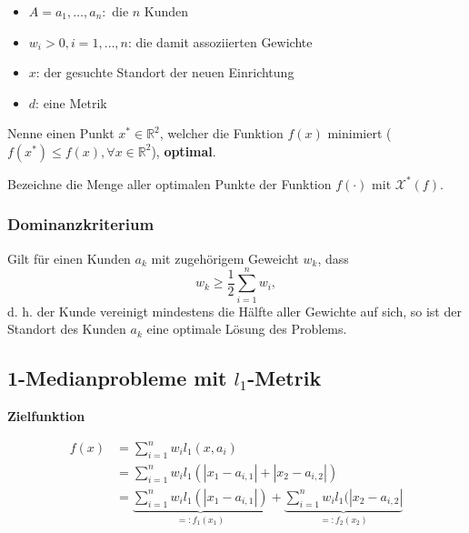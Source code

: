       \begin{itemize}
        \item $A = {a_1, \dots, a_n}:$ die $n$ Kunden
        \item $w_i > 0, i = 1, \dots, n$: die damit assoziierten Gewichte
        \item $x$: der gesuchte Standort der neuen Einrichtung 
        \item $d$: eine Metrik
      \end{itemize}

      \par Nenne einen Punkt $x^* \in \mathbb{R}^2$, welcher die Funktion $f(x)$ minimiert ($f(x^*) \leq f(x), \forall x \in \mathbb{R}^2$), \textbf{optimal}.

      \par Bezeichne die Menge aller optimalen Punkte der Funktion $f(\cdot)$ mit $\mathcal{X}^*(f)$.


      \subsubsection{Dominanzkriterium} %
      \label{ssub:dominanzkriterium}

        \par Gilt für einen Kunden $a_k$ mit zugehörigem Geweicht $w_k$, dass 
        \[w_k \geq \frac{1}{2}\sum_{i=1}^{n}w_i ,\]
        d. h. der Kunde vereinigt mindestens die Hälfte aller Gewichte auf sich, so ist der Standort des Kunden $a_k$ eine optimale Lösung des Problems.
      


    \subsection{1-Medianprobleme mit $l_1$-Metrik} %
    \label{sub:1_medianprobleme_mit_l1_Metrik}
    
      \par \textbf{Zielfunktion}

      \begin{equation}
        \begin{aligned}
            f(x) &= \sum_{i=1}^{n}w_il_1(x, a_i) \\
                 &= \sum_{i=1}^{n}w_il_1(\left|x_1 - a_{i,1}\right| + \left|x_2 - a_{i,2}\right|) \\
                 &= \underbrace{\sum_{i=1}^{n}w_il_1(\left|x_1 - a_{i,1}\right|)}_{=: f_1(x_1)} + \underbrace{\sum_{i=1}^{n}w_il_1(\left|x_2 - a_{i,2}\right|}_{=:f_2(x_2)}
        \end{aligned}
      \end{equation}

